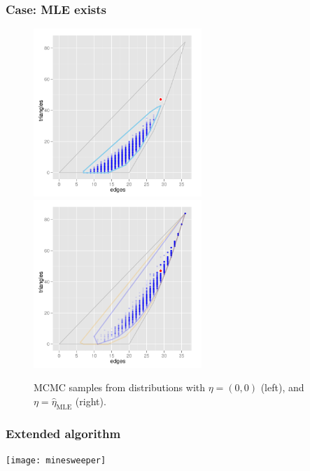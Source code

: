 \documentclass[slidestop,compress, 10pt]{beamer}
\newcommand{\etaMLE}{\hat{\eta}_{\textrm{MLE}}}
\begin{document}
\frame
{
\frametitle{Case: MLE exists}  
\begin{figure}[h]
\centering
\includegraphics[height=2.5in]{MCsample-far}
\includegraphics[height=2.5in]{MCsample-MLE}
\caption{MCMC samples from distributions with $\eta = (0,0)$ (left), and $\eta=\etaMLE$ (right).}
\label{F:MCsample-MLE exists}
\end{figure}
}


\frame
{
\frametitle{Extended algorithm}  
\texttt{[image: minesweeper]}


}
\end{document}

